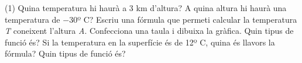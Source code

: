 \begin{mylist}
\begin{minipage}[t]{0.82\textwidth}
 	\begin{tasks}(1)
 		\task Quina temperatura hi haurà a 3 km d'altura? \vspace{0.1cm}
 		\task  A quina altura hi haurà una temperatura de $-$30º C? \vspace{0.1cm}
 		\task  Escriu una fórmula que permeti calcular la temperatura \textit{T} coneixent l'altura \textit{A}. Confecciona una taula i dibuixa la gràfica. Quin tipus de funció és? \vspace{0.1cm}
 		\task  Si la temperatura en la superfície és de 12º C, quina és llavors la fórmula? Quin tipus de funció és?
 	\end{tasks}
 \end{minipage}
 \hspace{0.5cm}
 \begin{minipage}{0.1\textwidth}
 	\centering
 	\vspace{4.5cm}

\end{minipage}
\end{mylist}
